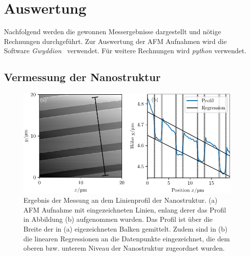 \section{Auswertung}
Nachfolgend werden die gewonnen Messergebnisse dargestellt und nötige Rechnungen durchgeführt.
Zur Auswertung der AFM Aufnahmen wird die Software \textit{Gwyddion}~\cite{} verwendet. Für weitere
Rechnungen wird \textit{python} verwendet.

\subsection{Vermessung der Nanostruktur}



\begin{figure}
  \centering
  \includegraphics[scale = 1]{../analysis/data/nanostruktur_linien/linien_profil.pdf}
  \caption{Ergebnis der Messung an dem Linienprofil der Nanostruktur. (a) AFM Aufnahme mit eingezeichneten
  Linien, enlang derer das Profil in Abbildung (b) aufgenommen wurden. Das Profil ist
  über die Breite der in (a) eigezeichneten Balken gemittelt. Zudem sind in (b) die linearen Regressionen
  an die Datenpunkte eingezeichnet, die dem oberen bzw. unterem Niveau der Nanostruktur zugeordnet wurden.}
  \label{fig: linien_profil}
\end{figure}



